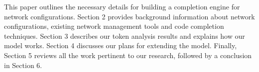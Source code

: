 This paper outlines the necessary details for building a completion engine for network configurations. Section 2 provides background information about network configurations, existing network management tools and code completion techniques. Section 3 describes our token analysis results and explains how our model works. Section 4 discusses our plans for extending the model. Finally, Section 5 reviews all the work pertinent to our research, followed by a conclusion in Section 6.

